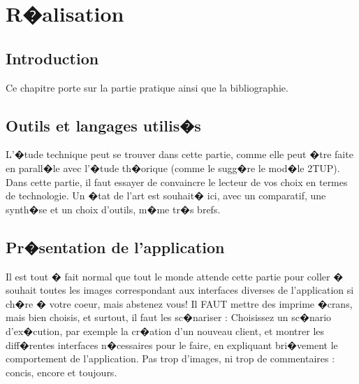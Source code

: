 
\setcounter{chapter}{2}
\chapter{R�alisation}
\minitoc %
\graphicspath{{Chapitre3/figures/}}

\pagestyle{fancy}
\fancyhf{}
\fancyhead[R]{\bfseries\rightmark}
\fancyfoot[R]{\thepage}
\renewcommand{\headrulewidth}{0.5pt}
\renewcommand{\footrulewidth}{0pt}
\renewcommand{\chaptermark}[1]{\markboth{\MakeUppercase{\chaptername~\thechapter. #1 }}{}}
\renewcommand{\sectionmark}[1]{\markright{\thechapter.\thesection~ #1}}

\begin{spacing}{1.2}

\section*{Introduction}
Ce chapitre porte sur la partie pratique ainsi que la bibliographie.

\section{Outils et langages utilis�s}
L'�tude technique peut se trouver dans cette partie, comme elle peut �tre faite en
parall�le avec l'�tude th�orique (comme le sugg�re le mod�le 2TUP).
Dans cette partie, il faut essayer de convaincre le lecteur de vos choix en termes de
technologie. Un �tat de l'art est souhait� ici, avec un comparatif, une synth�se et un choix 
d'outils, m�me tr�s brefs.
\section{Pr�sentation de l'application}
Il est tout � fait normal que tout le monde attende cette partie pour coller � souhait toutes les images
correspondant aux interfaces diverses de l'application si ch�re � votre coeur, mais
abstenez vous! Il FAUT mettre des imprime �crans, mais bien choisis, et surtout, il faut les sc�nariser : Choisissez un sc�nario d'ex�cution, par exemple la cr�ation d'un 
nouveau client, et montrer les diff�rentes interfaces n�cessaires pour le faire, en
expliquant bri�vement le comportement de l'application. Pas trop d'images, ni trop de
commentaires : concis, encore et toujours.


\end{spacing}
